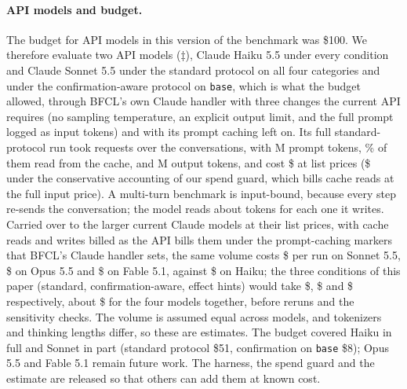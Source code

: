 \documentclass{article}
\newcommand{\cls}[1]{\texttt{#1}}
\begin{document}
\paragraph{API models and budget.} The budget for API models in this version of the benchmark was \$100. We therefore
evaluate two API models ($\ddagger$), Claude Haiku 5.5 under every condition and Claude Sonnet 5.5 under the standard
protocol on all four categories and under the confirmation-aware protocol on \cls{base}, which is what the budget allowed, through BFCL's own Claude handler with three changes the current
API requires (no sampling temperature, an explicit output limit, and the full prompt logged as input tokens) and with its
prompt caching left on. Its full standard-protocol run took \apiRequests{} requests over the \apiConversations{}
conversations, with \apiPromptTokensM{}M prompt tokens, \apiCacheShare\% of them read from the cache, and
\apiOutputTokensM{}M output tokens, and cost \$\haikuSpent{} at list prices (\$\haikuSpentCons{} under the conservative
accounting of our spend guard, which bills cache reads at the full input price). A multi-turn benchmark is input-bound,
because every step re-sends the conversation; the model reads about \apiInOutRatio{} tokens for each one it writes.
Carried over to the larger current Claude models at their list prices, with cache reads and writes billed as the API
bills them under the prompt-caching markers that BFCL's Claude handler sets, the same volume costs \$\budgetSonnetRun{}
per run on Sonnet 5.5, \$\budgetOpusRun{} on Opus 5.5 and \$\budgetFableRun{} on Fable 5.1, against \$\budgetHaikuRun{} on
Haiku; the three conditions of this paper (standard, confirmation-aware, effect hints) would take \$\budgetSonnetAll{},
\$\budgetOpusAll{} and \$\budgetFableAll{} respectively, about \$\budgetAllModels{} for the four models together, before
reruns and the sensitivity checks. The volume is assumed equal across models, and tokenizers and thinking lengths differ,
so these are estimates. The budget covered Haiku in full and
Sonnet in part (standard protocol \$51, confirmation on \cls{base} \$8); Opus 5.5 and Fable 5.1 remain future work. The
harness, the spend guard and the estimate are released so that others can add them at known cost.

\end{document}
